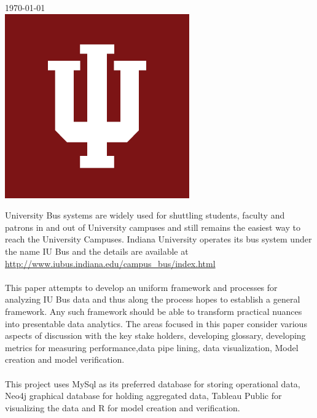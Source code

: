 \documentclass[12pt]{article}
\renewenvironment{abstract}
 {\small
  \begin{center}
  \bfseries \abstractname\vspace{-.5em}\vspace{0pt}
  \end{center}
  \list{}{
    \setlength{\leftmargin}{.5cm}%
    \setlength{\rightmargin}{\leftmargin}%
  }%
  \item\relax}
 {\endlist}
\begin{document}
\begin{titlepage}
{\large \today}\\[2cm] 

\includegraphics[scale=0.5]{iu_logo}\\[1cm] 

\vfill 

\end{titlepage}


\begin{abstract}
University Bus systems are widely used for shuttling students, faculty and patrons in and out of University campuses and still remains the easiest way to reach the University Campuses. Indiana University operates its bus system under the name IU Bus and the details are available at \url{http://www.iubus.indiana.edu/campus_bus/index.html} \\ \\
This paper attempts to develop an uniform framework and processes for analyzing IU Bus data and thus along the process hopes to establish a general framework. Any such framework should be able to transform practical nuances into presentable data analytics. The areas focused in this paper consider various aspects of discussion with the key stake holders, developing glossary, developing metrics for measuring performance,data pipe lining, data visualization, Model creation and model verification.\\ \\
This project uses MySql as its preferred database for storing operational data, Neo4j graphical database for holding aggregated data, Tableau Public for visualizing the data and R for model creation and verification.
\end{abstract}
\end{document}
